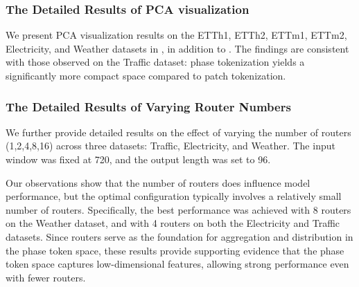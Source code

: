 \subsubsection{The Detailed Results of PCA visualization}

We present PCA visualization results on the ETTh1, ETTh2, ETTm1, ETTm2, Electricity, and Weather datasets in , in addition to .
The findings are consistent with those observed on the Traffic dataset: phase tokenization yields a significantly more compact space compared to patch tokenization.


\subsubsection{The Detailed Results of Varying Router Numbers}
\label{sec:all_results_router_numbers}
We further provide detailed results on the effect of varying the number of routers (1,2,4,8,16) across three datasets: Traffic, Electricity, and Weather. The input window was fixed at 720, and the output length was set to 96.

Our observations show that the number of routers does influence model performance, but the optimal configuration typically involves a relatively small number of routers. Specifically, the best performance was achieved with 8 routers on the Weather dataset, and with 4 routers on both the Electricity and Traffic datasets.
Since routers serve as the foundation for aggregation and distribution in the phase token space, these results provide supporting evidence that the phase token space captures low-dimensional features, allowing strong performance even with fewer routers.




